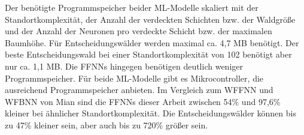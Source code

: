 \newline
\newline
Der benötigte Programmspeicher beider ML-Modelle skaliert mit der Standortkomplexität, der Anzahl der verdeckten Schichten bzw. der Waldgröße
und der Anzahl der Neuronen pro verdeckte Schicht bzw. der maximalen Baumhöhe.
Für Entscheidungswälder werden maximal ca. 4,7 MB benötigt.
Der beste Entscheidungswald bei einer Standortkomplexität von 102 benötigt aber nur ca. 1,1 MB.
Die FFNNs hingegen benötigen deutlich weniger Programmspeicher.
Für beide ML-Modelle gibt es Mikrocontroller, die ausreichend Programmspeicher anbieten.
Im Vergleich zum WFFNN und WFBNN von Mian sind die FFNNs dieser Arbeit zwischen 54\% und 97,6\% kleiner bei ähnlicher Standortkomplexität.
Die Entscheidungswälder können bis zu 47\% kleiner sein, aber auch bis zu 720\% größer sein.